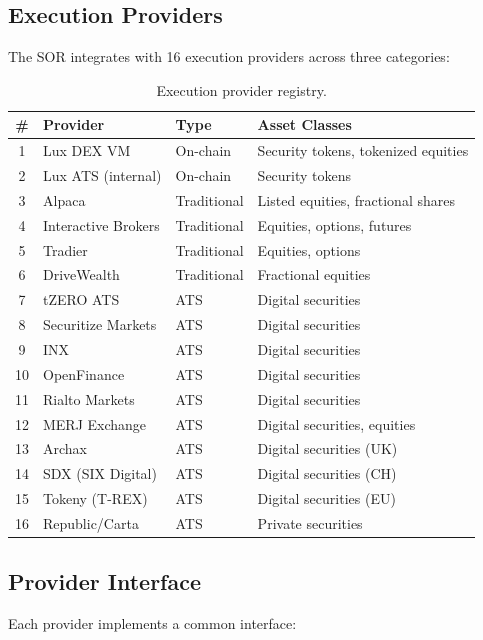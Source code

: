 \documentclass[11pt,a4paper]{article}
\begin{document}
\subsection{Execution Providers}

The SOR integrates with 16 execution providers across three categories:

\begin{table}[H]
\centering
\caption{Execution provider registry.}
\label{tab:providers}
\begin{tabular}{clll}
\toprule
\textbf{\#} & \textbf{Provider} & \textbf{Type} & \textbf{Asset Classes} \\
\midrule
1 & Lux DEX VM & On-chain & Security tokens, tokenized equities \\
2 & Lux ATS (internal) & On-chain & Security tokens \\
3 & Alpaca & Traditional & Listed equities, fractional shares \\
4 & Interactive Brokers & Traditional & Equities, options, futures \\
5 & Tradier & Traditional & Equities, options \\
6 & DriveWealth & Traditional & Fractional equities \\
7 & tZERO ATS & ATS & Digital securities \\
8 & Securitize Markets & ATS & Digital securities \\
9 & INX & ATS & Digital securities \\
10 & OpenFinance & ATS & Digital securities \\
11 & Rialto Markets & ATS & Digital securities \\
12 & MERJ Exchange & ATS & Digital securities, equities \\
13 & Archax & ATS & Digital securities (UK) \\
14 & SDX (SIX Digital) & ATS & Digital securities (CH) \\
15 & Tokeny (T-REX) & ATS & Digital securities (EU) \\
16 & Republic/Carta & ATS & Private securities \\
\bottomrule
\end{tabular}
\end{table}

\subsection{Provider Interface}

Each provider implements a common interface:
\end{document}
